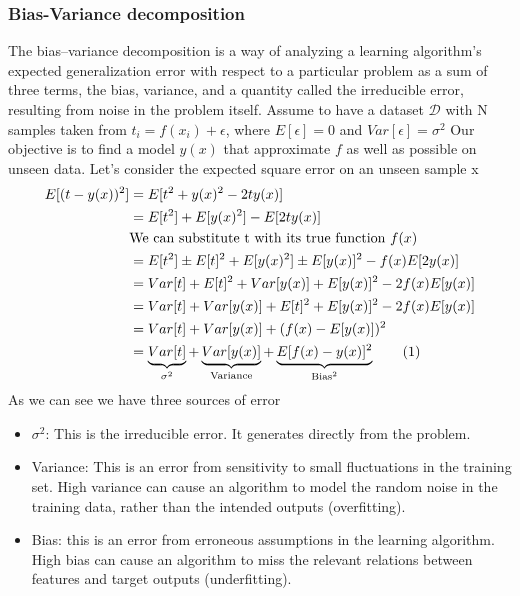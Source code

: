 \documentclass[main.tex]{subfiles}
\newcommand\numberthis{\addtocounter{equation}{1}\tag{\theequation}}
\begin{document}
\subsubsection{Bias-Variance decomposition}
The bias–variance decomposition is a way of analyzing a learning algorithm's expected generalization error with respect to a particular problem as a sum of three terms, the bias, variance, and a quantity called the irreducible error, resulting from noise in the problem itself.
Assume to have a dataset $\mathcal{D}$ with N samples taken from $t_i = f(x_i) + \epsilon$, where $E[\epsilon] = 0$ and $Var[\epsilon] = \sigma^2$
Our objective is to find a model $y(x)$ that approximate $f$ as well as possible on unseen data.
Let's consider the expected square error on an unseen sample x
\begin{align*}
    E[(t-y(x))^2] & = E[t^2 + y(x)^2 -2ty(x)]                                                                                     \\
                  & = E[t^2] + E[y(x)^2] - E[2ty(x)]                                                                              \\
                  & \text{We can substitute t with its true function }f(x)                                                        \\
                  & = E[t^2] \pm E[t]^2 + E[y(x)^2] \pm E[y(x)]^2 - f(x)E[2y(x)]                                                  \\
                  & = Var[t] + E[t]^2 + Var[y(x)] + E[y(x)]^2 - 2f(x)E[y(x)]                                                      \\
                  & = Var[t] + Var[y(x)] + E[t]^2 + E[y(x)]^2 - 2f(x)E[y(x)]                                                      \\
                  & = Var[t] + Var[y(x)] + (f(x) - E[y(x)])^2                                                                     \\
                  & = \underbrace{Var[t]}_{\sigma^2} + \underbrace{Var[y(x)]}_{\text{Variance}} + \underbrace{E[f(x) - y(x)]^2}_{
        \text{Bias}^2} \numberthis
\end{align*}
As we can see we have three sources of error
\begin{itemize}
    \item $\sigma^2$: This is the irreducible error. It generates directly from the problem.
    \item Variance: This is an error from sensitivity to small fluctuations in the training set. High variance can cause an algorithm to model the random noise in the training data, rather than the intended outputs (overfitting).
    \item Bias: this is an error from erroneous assumptions in the learning algorithm. High bias can cause an algorithm to miss the relevant relations between features and target outputs (underfitting).
\end{itemize}
\end{document}
